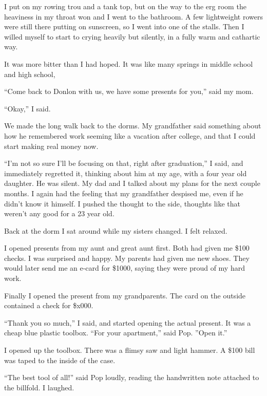 I put on my rowing trou and a tank top, but on the way to the erg room the
heaviness in my throat won and I went to the bathroom.  A few lightweight
rowers were still there putting on sunscreen, so I went into one of the stalls.
Then I willed myself to start to crying heavily but silently, in a fully warm
and cathartic way.  

It was more bitter than I had hoped.  It was like many springs in middle school
and high school, 

``Come back to Donlon with us, we have some presents for you,'' said my mom. 

``Okay,'' I said.  

We made the long walk back to the dorms.  My grandfather said something about
how he remembered work seeming like a vacation after college, and that I could
start making real money now.

``I'm not so sure I'll be focusing on that, right after graduation,'' I said,
and immediately regretted it, thinking about him at my age, with a four year old
daughter.  He was silent.  My dad and I talked about my plans for the next
couple months.  I again had the feeling that my grandfather despised me, even if
he didn't know it himself.  I pushed the thought to the side, thoughts like that
weren't any good for a 23 year old.

Back at the dorm I sat around while my sisters changed.  I felt relaxed.

I opened presents from my aunt and great aunt first.  Both had given me \$100
checks.  I was surprised and happy.  My parents had given me new shoes.  They
would later send me an e-card for \$1000, saying they were proud of my hard
work.  

Finally I opened the present from my grandparents.  The card on the outside
contained a check for \$x000.  

``Thank you so much,'' I said, and started opening the actual present.  It was a
cheap blue plastic toolbox.  ``For your apartment,'' said Pop.  ''Open it.''

I opened up the toolbox.  There was a flimsy saw and light hammer.  A \$100 bill
was taped to the inside of the case.

``The best tool of all!'' said Pop loudly, reading the handwritten note attached
to the billfold.  I laughed.
